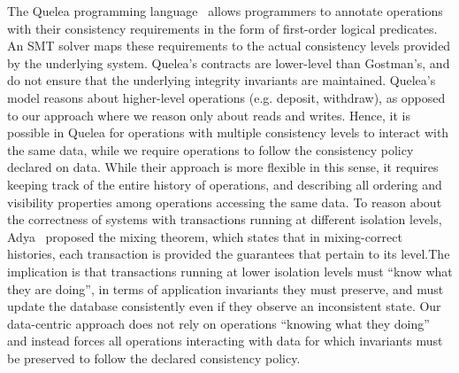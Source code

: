 \documentclass[numbers]{sigplanconf}
\begin{document}
The Quelea programming language~\cite{sivaramakrishnan2015declarative} allows
programmers to annotate operations with their consistency requirements
in the form of first-order logical predicates.
An SMT solver maps these requirements to the actual
consistency levels provided by the underlying system. Quelea's contracts are
lower-level than Gostman's, and do not ensure that the underlying integrity
invariants are maintained. Quelea's model reasons about higher-level
operations (e.g. deposit, withdraw), as opposed to our approach where we reason 
only about reads and writes. Hence, it is possible in Quelea for operations with
multiple consistency levels to interact with the same data, while we require 
operations to follow the consistency policy declared on data. While their 
approach is more flexible in this sense, it requires keeping track of the entire
history of operations, and describing all ordering and visibility properties among 
operations accessing the same data.
To reason about the correctness of systems with transactions running at different
isolation levels, Adya~\cite{adya2000generalized} proposed the mixing
theorem, which states that in mixing-correct histories, each transaction is provided 
the guarantees that pertain to its level.The implication is that transactions running 
at lower isolation levels must ``know what they are doing'', in terms of application 
invariants they must preserve, and must update the database consistently even if they observe an
inconsistent state. Our data-centric approach does not rely on operations
``knowing what they doing'' and instead forces all operations interacting with data
for which invariants must be preserved to follow the declared consistency
policy. 
\end{document}
